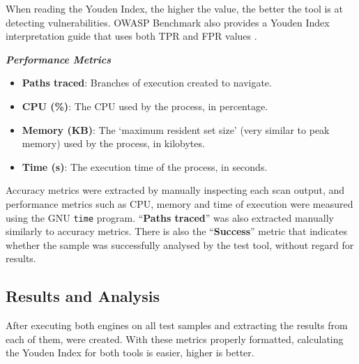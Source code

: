 When reading the Youden Index, the higher the value, the better the tool is at detecting vulnerabilities. OWASP Benchmark also provides a Youden Index interpretation guide that uses both TPR and FPR values \cite{owasp_benchmark_scoring}.

\par\noindent\textbf{\textit{Performance Metrics}}
\begin{itemize}
    \item \textbf{Paths traced}: Branches of execution created to navigate.
    \item \textbf{CPU (\%)}: The CPU used by the process, in percentage.
    \item \textbf{Memory (KB)}: The `maximum resident set size' (very similar to peak memory) used by the process, in kilobytes.
    \item \textbf{Time (s)}: The execution time of the process, in seconds.
\end{itemize}

Accuracy metrics were extracted by manually inspecting each scan output, and performance metrics such as CPU, memory and time of execution were measured using the GNU \lstinline$time$ program. ``\textbf{Paths traced}'' was also extracted manually similarly to accuracy metrics. There is also the ``\textbf{Success}'' metric that indicates whether the sample was successfully analysed by the test tool, without regard for results.





\subsection{Results and Analysis}\label{section:results}

After executing both engines on all test samples and extracting the results from each of them,  were created. With these metrics properly formatted, calculating the Youden Index for both tools is easier, higher is better.

